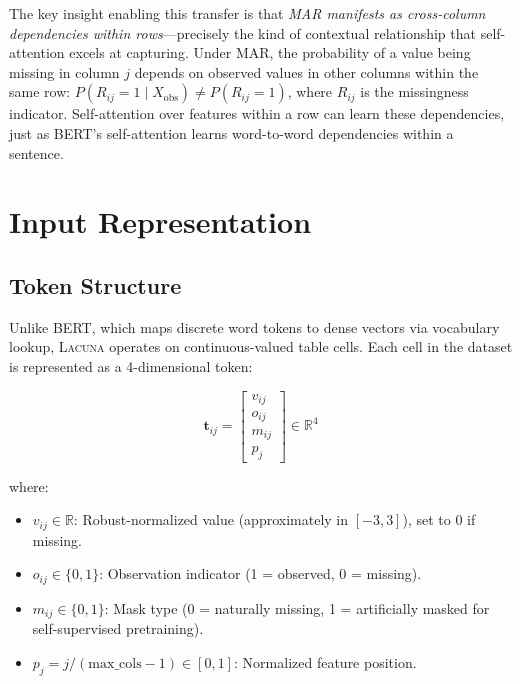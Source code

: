 \documentclass[11pt]{article}
\newcommand{\RR}{\mathbb{R}}
\newcommand{\lacuna}{\textsc{Lacuna}}
\begin{document}
The key insight enabling this transfer is that \emph{MAR manifests as cross-column dependencies within rows}---precisely the kind of contextual relationship that self-attention excels at capturing. Under MAR, the probability of a value being missing in column $j$ depends on observed values in other columns within the same row: $P(R_{ij} = 1 \mid X_{\text{obs}}) \neq P(R_{ij} = 1)$, where $R_{ij}$ is the missingness indicator. Self-attention over features within a row can learn these dependencies, just as BERT's self-attention learns word-to-word dependencies within a sentence.

\section{Input Representation}
\label{sec:input}

\subsection{Token Structure}

Unlike BERT, which maps discrete word tokens to dense vectors via vocabulary lookup, \lacuna{} operates on continuous-valued table cells. Each cell in the dataset is represented as a 4-dimensional token:

\begin{equation}
\mathbf{t}_{ij} = \begin{bmatrix} v_{ij} \\ o_{ij} \\ m_{ij} \\ p_j \end{bmatrix} \in \RR^4
\label{eq:token}
\end{equation}

where:
\begin{itemize}[nosep]
    \item $v_{ij} \in \RR$: Robust-normalized value (approximately in $[-3, 3]$), set to 0 if missing.
    \item $o_{ij} \in \{0, 1\}$: Observation indicator (1 = observed, 0 = missing).
    \item $m_{ij} \in \{0, 1\}$: Mask type (0 = naturally missing, 1 = artificially masked for self-supervised pretraining).
    \item $p_j = j / (\text{max\_cols} - 1) \in [0, 1]$: Normalized feature position.
\end{itemize}
\end{document}
